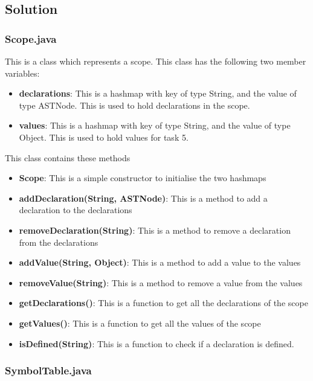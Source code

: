 \documentclass{article}
\begin{document}
			\subsection{Solution}
			
			\subsubsection{Scope.java}
			
			This is a class which represents a scope. This class has the following two member variables:
			\begin{itemize}
			\item \textbf{declarations}: This is a hashmap with key of type String, and the value of type ASTNode. This is used to hold declarations in the scope.
			\item \textbf{values}: This is a hashmap with key of type String, and the value of type Object. This is used to hold values for task 5.
			\end{itemize}
			
			This class contains these methods
			\begin{itemize}
			\item \textbf{Scope}: This is a simple constructor to initialise the two hashmaps
			\item \textbf{addDeclaration(String, ASTNode)}: This is a method to add a declaration to the declarations
			\item \textbf{removeDeclaration(String)}: This is a method to remove a declaration from the declarations
			\item \textbf{addValue(String, Object)}: This is a method to add a value to the values
			\item \textbf{removeValue(String)}: This is a method to remove a value from the values
			\item \textbf{getDeclarations()}: This is a function to get all the declarations of the scope
			\item \textbf{getValues()}: This is a function to get all the values of the scope
			\item \textbf{isDefined(String)}: This is a function to check if a declaration is defined.
			\end{itemize}
			
				\subsubsection{SymbolTable.java}
			
\end{document}
